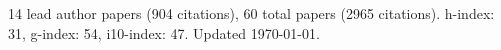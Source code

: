 14 lead author papers (904 citations),
60 total papers (2965 citations).\newline
h-index: 31, g-index: 54, i10-index: 47. Updated \today.